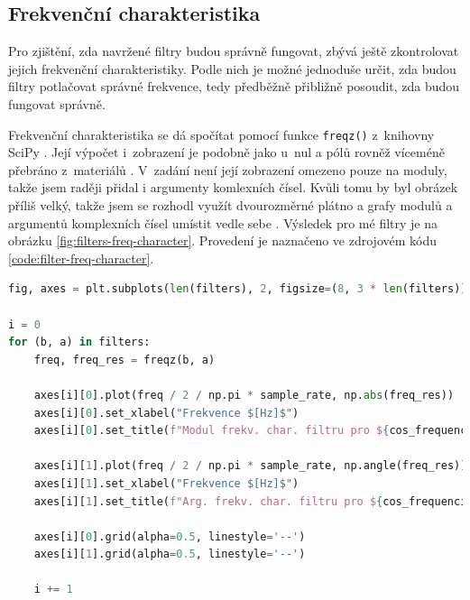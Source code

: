 \documentclass[a4paper, 11pt, final]{article}
\begin{document}
\subsection{Frekvenční charakteristika}

Pro zjištění, zda navržené filtry budou správně fungovat, zbývá ještě zkontrolovat jejich frekvenční charakteristiky. Podle nich je možné jednoduše určit, zda budou filtry potlačovat správné frekvence, tedy předběžně přibližně posoudit, zda budou fungovat správně.

Frekvenční charakteristika se dá spočítat pomocí funkce \texttt{freqz()} z~knihovny SciPy \cite{scipy-reference}. Její výpočet i~zobrazení je podobně jako u~nul a pólů rovněž víceméně přebráno z~materiálů \cite{zmolikova-demo}. V~zadání není její zobrazení omezeno pouze na moduly, takže jsem raději přidal i argumenty komlexních čísel. Kvůli tomu by byl obrázek příliš velký, takže jsem se rozhodl využít dvourozměrné plátno a grafy modulů a argumentů komplexních čísel umístit vedle sebe \cite{matplotlib-reference}. Výsledek pro mé filtry je na obrázku \ref{fig:filters-freq-character}. Provedení je naznačeno ve zdrojovém kódu \ref{code:filter-freq-character}.

\begin{lstlisting}[language=Python, caption=Výpočet a zobrazení frekvenční charakteristiky filtrů, label={code:filter-freq-character}]
fig, axes = plt.subplots(len(filters), 2, figsize=(8, 3 * len(filters)))

i = 0
for (b, a) in filters:
    freq, freq_res = freqz(b, a)

    axes[i][0].plot(freq / 2 / np.pi * sample_rate, np.abs(freq_res))
    axes[i][0].set_xlabel("Frekvence $[Hz]$")
    axes[i][0].set_title(f"Modul frekv. char. filtru pro ${cos_frequencies[i]}\\ Hz$")

    axes[i][1].plot(freq / 2 / np.pi * sample_rate, np.angle(freq_res))
    axes[i][1].set_xlabel("Frekvence $[Hz]$")
    axes[i][1].set_title(f"Arg. frekv. char. filtru pro ${cos_frequencies[i]}\\ Hz$")

    axes[i][0].grid(alpha=0.5, linestyle='--')
    axes[i][1].grid(alpha=0.5, linestyle='--')

    i += 1
\end{lstlisting}
\end{document}
